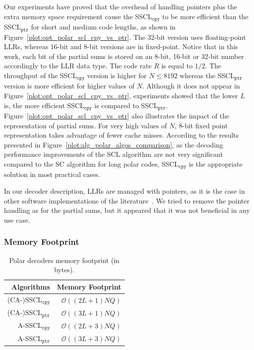 Our experiments have proved that the overhead of handling pointers plus the
extra memory space requirement cause the SSCL$_{\texttt{cpy}}$ to be more
efficient than the SSCL$_{\texttt{ptr}}$ for short and medium code lengths, as
shown in Figure~\ref{plot:opt_polar_scl_cpy_vs_ptr}. The 32-bit version uses
floating-point LLRs, whereas 16-bit and 8-bit versions are in fixed-point.
Notice that in this work, each bit of the partial sums is stored on an 8-bit,
16-bit or 32-bit number accordingly to the LLR data type. The code rate $R$ is
equal to $1/2$. The throughput of the SSCL$_{\texttt{cpy}}$ version is higher
for $N \leq 8192$ whereas the SSCL$_{\texttt{ptr}}$ version is more efficient
for higher values of $N$. Although it does not appear in
Figure~\ref{plot:opt_polar_scl_cpy_vs_ptr}, experiments showed that the lower
$L$ is, the more efficient SSCL$_{\texttt{cpy}}$ is compared to
SSCL$_{\texttt{ptr}}$. Figure~\ref{plot:opt_polar_scl_cpy_vs_ptr} also
illustrates the impact of the representation of partial sums. For very high
values of $N$, 8-bit fixed point representation takes advantage of fewer cache
misses. According to the results presented in
Figure~\ref{plot:alg_polar_algos_comparison}, as the decoding performance
improvements of the SCL algorithm are not very significant compared to the SC
algorithm for long polar codes, SSCL$_{\texttt{cpy}}$ is the appropriate
solution in most practical cases.

In our decoder description, LLRs are managed with pointers, as it is the case in
other software implementations of the
literature~\cite{Sarkis2014b,Sarkis2016,Shen2016}. We tried to remove the
pointer handling as for the partial sums, but it appeared that it was not
beneficial in any use case.

\subsubsection{Memory Footprint}

\begin{table}[htp]
  \centering
  \caption{Polar decoders memory footprint (in bytes).}
  \label{tab:opt_polar_scl_memory_footprint}
   \begin{tabular}{r r}
    \textbf{Algorithms}        & \textbf{Memory Footprint} \\
    \hline
    \hline
    (CA-)SSCL$_{\texttt{cpy}}$ & $\mathcal{O}((2L + 1)NQ)$ \\
    (CA-)SSCL$_{\texttt{ptr}}$ & $\mathcal{O}((3L + 1)NQ)$ \\
    A-SSCL$_{\texttt{cpy}}$    & $\mathcal{O}((2L + 3)NQ)$ \\
    A-SSCL$_{\texttt{ptr}}$    & $\mathcal{O}((3L + 3)NQ)$ \\
  \end{tabular}
\end{table}

